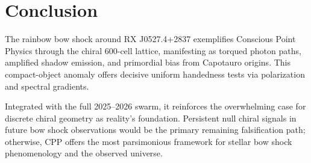 \documentclass[11pt]{article}
\begin{document}
\section{Conclusion}
The rainbow bow shock around RX J0527.4+2837 exemplifies Conscious Point Physics through the chiral 600-cell lattice, manifesting as torqued photon paths, amplified shadow emission, and primordial bias from Capotauro origins. This compact-object anomaly offers decisive uniform handedness tests via polarization and spectral gradients.  

Integrated with the full 2025--2026 swarm, it reinforces the overwhelming case for discrete chiral geometry as reality's foundation. Persistent null chiral signals in future bow shock observations would be the primary remaining falsification path; otherwise, CPP offers the most parsimonious framework for stellar bow shock phenomenology and the observed universe.
\end{document}
